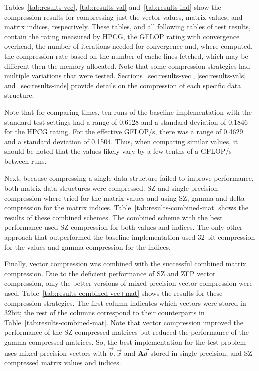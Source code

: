 Tables~\ref{tab:results-vec}, \ref{tab:results-val} and~\ref{tab:results-ind} show the compression results for compressing just the vector values, matrix values, and matrix indices, respectively.
These tables, and all following tables of test results, contain the rating measured by HPCG, the GFLOP rating with convergence overhead, the number of iterations needed for convergence and, where computed, the compression rate based on the number of cache lines fetched, which may be different then the memory allocated.
Note that some compression strategies had multiple variations that were tested.
Sections~\ref{sec:results-vec}, \ref{sec:results-vals} and~\ref{sec:results-inds} provide details on the compression of each specific data structure.






Note that for comparing times, ten runs of the baseline implementation with the standard test settings had a range of 0.6128 and a standard deviation of 0.1846 for the HPCG rating.
For the effective GFLOP/s, there was a range of 0.4629 and a standard deviation of 0.1504.
Thus, when comparing similar values, it should be noted that the values likely vary by a few tenths of a GFLOP/s between runs.

Next, because compressing a single data structure failed to improve performance, both matrix data structures were compressed.
SZ and single precision compression where tried for the matrix values and using SZ, gamma and delta compression for the matrix indices.
Table~\ref{tab:results-combined-mat} shows the results of these combined schemes.
The combined scheme with the best performance used SZ compression for both values and indices.
The only other approach that outperformed the baseline implementation used 32-bit compression for the values and gamma compression for the indices.



Finally, vector compression was combined with the successful combined matrix compression.
Due to the deficient performance of SZ and ZFP vector compression, only the better versions of mixed precision vector compression were used.
Table~\ref{tab:results-combined-vec+mat} shows the results for these compression strategies.
The first column indicates which vectors were stored in 32bit; the rest of the columns correspond to their counterparts in Table~\ref{tab:results-combined-mat}.
Note that vector compression improved the performance of the SZ compressed matrices but reduced the performance of the gamma compressed matrices.
So, the best implementation for the test problem uses mixed precision vectors with \(\vec{b}, \vec{x}\) and \(\mathbf{A}\vec{d}\) stored in single precision, and SZ compressed matrix values and indices.


